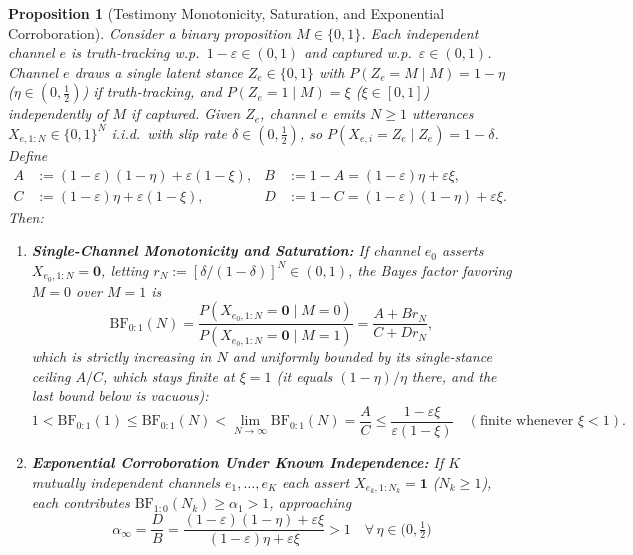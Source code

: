 \documentclass[11pt,a4paper]{article}
\newtheorem{proposition}{Proposition}
\theoremstyle{definition}
\theoremstyle{remark}
\newcommand{\BF}{\mathrm{BF}}
\begin{document}
\begin{proposition}[Testimony Monotonicity, Saturation, and Exponential Corroboration]
\label{prop:testimony}
Consider a binary proposition $M \in \{0, 1\}$. Each independent channel $e$ is truth-tracking w.p.\ $1 - \varepsilon \in (0, 1)$ and captured w.p.\ $\varepsilon \in (0, 1)$. Channel $e$ draws a single latent stance $Z_e \in \{0, 1\}$ with $P(Z_e = M \mid M) = 1 - \eta$ ($\eta \in (0, \tfrac{1}{2})$) if truth-tracking, and $P(Z_e = 1 \mid M) = \xi$ ($\xi \in [0, 1]$) independently of $M$ if captured. Given $Z_e$, channel $e$ emits $N \ge 1$ utterances $X_{e,1:N} \in \{0,1\}^N$ i.i.d.\ with slip rate $\delta \in (0, \tfrac{1}{2})$, so $P(X_{e,i} = Z_e \mid Z_e) = 1 - \delta$. Define
\begin{align}
  A &:= (1-\varepsilon)(1-\eta) + \varepsilon(1-\xi), & B &:= 1 - A = (1-\varepsilon)\eta + \varepsilon\xi, \nonumber\\
  C &:= (1-\varepsilon)\eta + \varepsilon(1-\xi),     & D &:= 1 - C = (1-\varepsilon)(1-\eta) + \varepsilon\xi.
\end{align}
Then:
\begin{enumerate}[leftmargin=1.8em]
  \item \textbf{Single-Channel Monotonicity and Saturation:} If channel $e_0$ asserts $X_{e_0,1:N} = \mathbf{0}$, letting $r_N := [\delta / (1-\delta)]^N \in (0, 1)$, the Bayes factor favoring $M=0$ over $M=1$ is
  \begin{equation}
    \BF_{0:1}(N) = \frac{P(X_{e_0,1:N} = \mathbf{0} \mid M=0)}{P(X_{e_0,1:N} = \mathbf{0} \mid M=1)} = \frac{A + B r_N}{C + D r_N},
    \label{eq:bf_sat}
  \end{equation}
  which is strictly increasing in $N$ and uniformly bounded by its single-stance ceiling $A/C$, which stays finite at $\xi = 1$ (it equals $(1-\eta)/\eta$ there, and the last bound below is vacuous):
  \begin{equation}
    1 < \BF_{0:1}(1) \le \BF_{0:1}(N) < \lim_{N \to \infty} \BF_{0:1}(N) = \frac{A}{C}
    \le \frac{1 - \varepsilon\xi}{\varepsilon(1-\xi)} \quad (\text{finite whenever } \xi < 1).
    \label{eq:bf_ceiling}
  \end{equation}
  \item \textbf{Exponential Corroboration Under Known Independence:} If $K$ mutually independent channels $e_1, \dots, e_K$ each assert $X_{e_k,1:N_k} = \mathbf{1}$ ($N_k \ge 1$), each contributes $\BF_{1:0}(N_k) \ge \alpha_1 > 1$, approaching
  \begin{equation}
    \alpha_\infty = \frac{D}{B} = \frac{(1-\varepsilon)(1-\eta) + \varepsilon\xi}{(1-\varepsilon)\eta + \varepsilon\xi} > 1 \quad \forall\,\eta \in \bigl(0, \tfrac{1}{2}\bigr)

\end{equation}
\end{enumerate}
\end{proposition}
\end{document}
